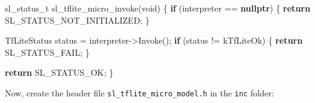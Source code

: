 \documentclass[
  9pt,
  letterpaper,
  abstract,
  titlepage]{scrbook}
\newenvironment{Shaded}{\begin{snugshade}}{\end{snugshade}}
\newcommand{\ControlFlowTok}[1]{\textcolor[rgb]{0.00,0.23,0.31}{\textbf{#1}}}
\newcommand{\DataTypeTok}[1]{\textcolor[rgb]{0.68,0.00,0.00}{#1}}
\newcommand{\KeywordTok}[1]{\textcolor[rgb]{0.00,0.23,0.31}{\textbf{#1}}}
\newcommand{\NormalTok}[1]{\textcolor[rgb]{0.00,0.23,0.31}{#1}}
\newcommand{\OperatorTok}[1]{\textcolor[rgb]{0.37,0.37,0.37}{#1}}
\begin{document}
\begin{Shaded}
\begin{Highlighting}[]
\NormalTok{sl\_status\_t sl\_tflite\_micro\_invoke}\OperatorTok{(}\DataTypeTok{void}\OperatorTok{)}
\OperatorTok{\{}
  \ControlFlowTok{if} \OperatorTok{(}\NormalTok{interpreter }\OperatorTok{==} \KeywordTok{nullptr}\OperatorTok{)} \OperatorTok{\{}
    \ControlFlowTok{return}\NormalTok{ SL\_STATUS\_NOT\_INITIALIZED}\OperatorTok{;}
  \OperatorTok{\}}
  
\NormalTok{  TfLiteStatus status }\OperatorTok{=}\NormalTok{ interpreter}\OperatorTok{{-}\textgreater{}}\NormalTok{Invoke}\OperatorTok{();}
  \ControlFlowTok{if} \OperatorTok{(}\NormalTok{status }\OperatorTok{!=}\NormalTok{ kTfLiteOk}\OperatorTok{)} \OperatorTok{\{}
    \ControlFlowTok{return}\NormalTok{ SL\_STATUS\_FAIL}\OperatorTok{;}
  \OperatorTok{\}}
  
  \ControlFlowTok{return}\NormalTok{ SL\_STATUS\_OK}\OperatorTok{;}
\OperatorTok{\}}
\end{Highlighting}
\end{Shaded}

Now, create the header file \texttt{sl\_tflite\_micro\_model.h} in the
\texttt{inc} folder:
\end{document}
